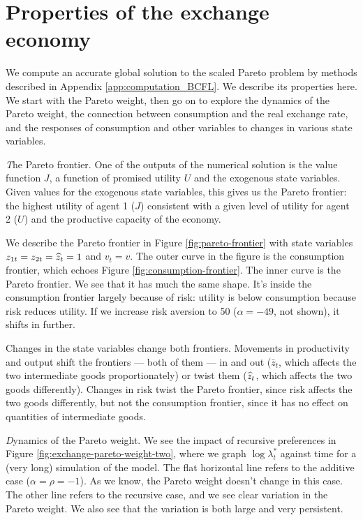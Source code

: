 
\section{Properties of the exchange economy}
\label{sec:properties}

We compute an accurate global solution to the scaled Pareto problem
by methods described in Appendix \ref{app:computation_BCFL}.
We  describe its properties here.
We start with the Pareto weight, then go on to explore
the dynamics of the Pareto weight,
the connection between consumption and the real exchange rate,
and the responses of consumption and other variables to changes in various state variables.


{\textit The Pareto frontier.\/}
One of the outputs of the numerical solution is the value function $J$, a function of
promised utility $U$ and the exogenous state variables.
Given values for the exogenous state variables, this gives us the Pareto frontier:
the highest utility of agent 1 ($J$) consistent with a given level of utility
for agent 2 ($U$) and the productive capacity of the economy.

We describe the Pareto frontier in Figure \ref{fig:pareto-frontier}
with state variables $z_{1t} = z_{2t} = \widehat{z}_t = 1$ and $v_t = v$.
The outer curve in the figure is the consumption frontier,
which echoes Figure \ref{fig:consumption-frontier}.
The inner curve is the Pareto frontier.
We see that it has much the same shape.
It's inside the consumption frontier largely because of risk:
utility is below consumption because risk reduces utility.
If we increase risk aversion to 50 ($\alpha = -49$, not shown),
it shifts in further.

Changes in the state variables change both frontiers.
Movements in productivity and output shift the frontiers --- both of them ---
in and out ($\bar{z}_t$, which affects the two intermediate goods proportionately)
or twist them ($\widehat{z}_t$, which affects the two goods differently).
Changes in risk twist the Pareto frontier, since risk affects the two goods differently,
but not the consumption frontier, since it has no effect on quantities of intermediate goods.


{\textit Dynamics of the Pareto weight.\/}
We see the impact of recursive preferences in Figure \ref{fig:exchange-pareto-weight-two},
where we graph $\log \lambda^*_t $ against time for a (very long) simulation of the model.
The flat horizontal line refers to the additive case ($\alpha = \rho = -1$).
As we know, the Pareto weight doesn't change in this case.
The other line refers to the recursive case, and we see clear variation in the Pareto weight.
We also see that the variation is both large and very persistent.

